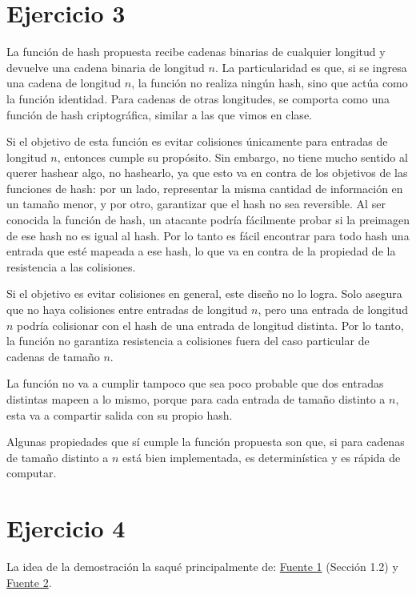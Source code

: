 \documentclass[12pt]{article}
\begin{document}
\section*{Ejercicio 3}

La función de hash propuesta recibe cadenas binarias de cualquier longitud y devuelve una cadena binaria de longitud $n$. La particularidad es que, si se ingresa una cadena de longitud $n$, la función no realiza ningún hash, sino que actúa como la función identidad. Para cadenas de otras longitudes, se comporta como una función de hash criptográfica, similar a las que vimos en clase.

Si el objetivo de esta función es evitar colisiones únicamente para entradas de longitud $n$, entonces cumple su propósito. Sin embargo, no tiene mucho sentido al querer hashear algo, no hashearlo, ya que esto va en contra de los objetivos de las funciones de hash: por un lado, representar la misma cantidad de información en un tamaño menor, y por otro, garantizar que el hash no sea reversible. Al ser conocida la función de hash, un atacante podría fácilmente probar si la preimagen de ese hash no es igual al hash. Por lo tanto es fácil encontrar para todo hash una entrada que esté mapeada a ese hash, lo que va en contra de la propiedad de la resistencia a las colisiones.

Si el objetivo es evitar colisiones en general, este diseño no lo logra. Solo asegura que no haya colisiones entre entradas de longitud $n$, pero una entrada de longitud $n$ podría colisionar con el hash de una entrada de longitud distinta. Por lo tanto, la función no garantiza resistencia a colisiones fuera del caso particular de cadenas de tamaño $n$.

La función no va a cumplir tampoco que sea poco probable que dos entradas distintas mapeen a lo mismo, porque para cada entrada de tamaño distinto a $n$, esta va a compartir salida con su propio hash.

Algunas propiedades que sí cumple la función propuesta son que, si para cadenas de tamaño distinto a $n$ está bien implementada, es determinística y es rápida de computar.

\section*{Ejercicio 4}

La idea de la demostración la saqué principalmente de: \href{https://scispace.com/pdf/attacks-on-some-rsa-signatures-4pe9259phw.pdf}{Fuente 1} (Sección 1.2) y \href{https://www.reddit.com/r/crypto/comments/mzv1q6/can_someone_explain_an_existential_forgery_attack/?utm_source=share&utm_medium=web3x&utm_name=web3xcss&utm_term=1&utm_content=share_button}{Fuente 2}.
\end{document}
